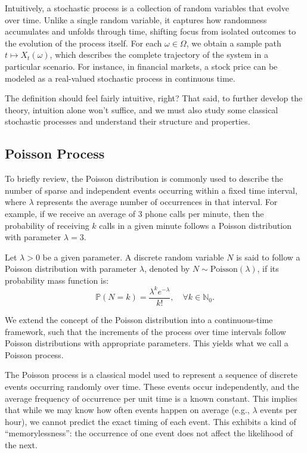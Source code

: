 \documentclass{article}
\begin{document}
Intuitively, a stochastic process is a collection of random variables that evolve over time. Unlike a single random variable, it captures how randomness accumulates and unfolds through time, shifting focus from isolated outcomes to the evolution of the process itself. For each $\omega \in \Omega$, we obtain a sample path $t \mapsto X_t(\omega)$, which describes the complete trajectory of the system in a particular scenario. For instance, in financial markets, a stock price can be modeled as a real-valued stochastic process in continuous time.

The definition should feel fairly intuitive, right? That said, to further develop the theory, intuition alone won't suffice, and we must also study some classical stochastic processes and understand their structure and properties.

\subsection{Poisson Process}

To briefly review, the Poisson distribution is commonly used to describe the number of sparse and independent events occurring within a fixed time interval, where $\lambda$ represents the average number of occurrences in that interval. For example, if we receive an average of 3 phone calls per minute, then the probability of receiving $k$ calls in a given minute follows a Poisson distribution with parameter $\lambda = 3$.

\begin{definition}
Let $\lambda > 0$ be a given parameter. A discrete random variable $N$ is said to follow a Poisson distribution with parameter $\lambda$, denoted by $N \sim \text{Poisson}(\lambda)$, if its probability mass function is:
\[
\mathbb{P}(N = k) = \frac{\lambda^k e^{-\lambda}}{k!}, \quad \forall k \in \mathbb{N}_0.
\]
\end{definition}

We extend the concept of the Poisson distribution into a continuous-time framework, such that the increments of the process over time intervals follow Poisson distributions with appropriate parameters. This yields what we call a Poisson process.

The Poisson process is a classical model used to represent a sequence of discrete events occurring randomly over time. These events occur independently, and the average frequency of occurrence per unit time is a known constant. This implies that while we may know how often events happen on average (e.g., $\lambda$ events per hour), we cannot predict the exact timing of each event. This exhibits a kind of “memorylessness”: the occurrence of one event does not affect the likelihood of the next.
\end{document}
